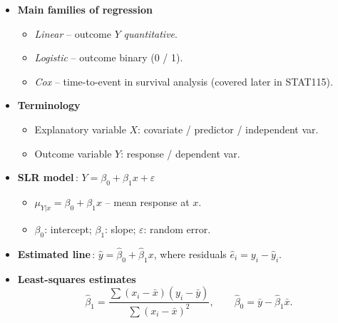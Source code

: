 \documentclass[12pt]{book}
\begin{document}

\newpage
\graphicspath{{./regressionPic/}}
\pagestyle{fancy}

\begin{itemize}
  \setlength{\itemsep}{6pt}  %

  \item \textbf{Main families of regression}
        \begin{itemize}
          \item \emph{Linear} – outcome \(Y\) \emph{quantitative}.
          \item \emph{Logistic} – outcome binary (0 / 1).
          \item \emph{Cox} – time-to-event in survival analysis (covered later in STAT115).
        \end{itemize}

  \item \textbf{Terminology}
        \begin{itemize}
          \item Explanatory variable \(X\): covariate / predictor / independent var.
          \item Outcome variable \(Y\): response / dependent var.
        \end{itemize}

  \item \textbf{SLR model}\,: \(Y=\beta_{0}+\beta_{1}x+\varepsilon\)
        \begin{itemize}
          \item \(\mu_{Y|x}=\beta_{0}+\beta_{1}x\) – mean response at \(x\).
          \item \(\beta_{0}\): intercept; \(\beta_{1}\): slope; \(\varepsilon\): random error.
        \end{itemize}

  \item \textbf{Estimated line}\,: \(\hat{y}=\hat{\beta}_{0}+\hat{\beta}_{1}x\),
        where residuals \(\hat{e}_{i}=y_{i}-\hat{y}_{i}\).

  \item \textbf{Least-squares estimates}
        \[
          \hat{\beta}_{1}=\frac{\sum(x_{i}-\bar{x})(y_{i}-\bar{y})}
                               {\sum(x_{i}-\bar{x})^{2}},
          \qquad
          \hat{\beta}_{0}=\bar{y}-\hat{\beta}_{1}\bar{x}.
        \]


\end{itemize}
\end{document}
